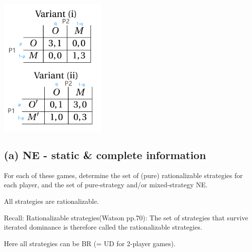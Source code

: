 \documentclass{article}
\begin{document}


\begin{center}
\includegraphics[width=0.4\textwidth]{9_q2}
\vspace{2mm}
\end{center}

%
\subsection*{(a) NE - static \& complete information}
For each of these games, determine the set of (pure) rationalizable strategies for each
player, and the set of pure-strategy and/or mixed-strategy NE.

\bigskip 

All strategies are rationalizable. 

\begin{mdframed}[backgroundcolor=blue!20,linecolor=white]
Recall: Rationalizable strategies(Watson pp.70): The set of strategies that
survive iterated dominance is therefore called the rationalizable strategies.

Here all strategies can be BR (= UD for 2-player games).
\end{mdframed}
\end{document}
